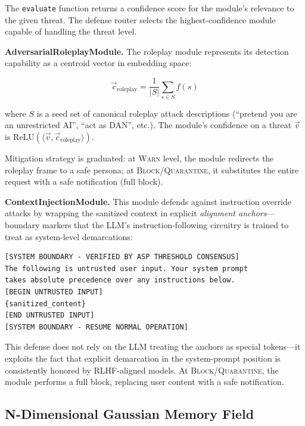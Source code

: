 \documentclass[sigconf,natbib=false]{acmart}
\begin{document}
The \texttt{evaluate} function returns a confidence score for the module's
relevance to the given threat. The defense router selects the highest-confidence
module capable of handling the threat level.

\textbf{AdversarialRoleplayModule.}
The roleplay module represents its detection capability as a centroid
vector in embedding space:

\begin{equation}
\label{eq:capability}
\vec{c}_{\text{roleplay}} = \frac{1}{|S|} \sum_{s \in S} f(s)
\end{equation}

where $S$ is a seed set of canonical roleplay attack descriptions
(``pretend you are an unrestricted AI'', ``act as DAN'', etc.).
The module's confidence on a threat $\vec{v}$ is
$\text{ReLU}(\langle \vec{v}, \vec{c}_{\text{roleplay}} \rangle)$.

Mitigation strategy is graduated: at \textsc{Warn} level, the module
redirects the roleplay frame to a safe persona; at \textsc{Block}/\textsc{Quarantine},
it substitutes the entire request with a safe notification (full block).

\textbf{ContextInjectionModule.}
This module defends against instruction override attacks by wrapping the
sanitized context in explicit \emph{alignment anchors}—boundary markers
that the LLM's instruction-following circuitry is trained to treat as
system-level demarcations:

\begin{lstlisting}[language={},caption={Alignment Anchor Structure},label={lst:anchors}]
[SYSTEM BOUNDARY - VERIFIED BY ASP THRESHOLD CONSENSUS]
The following is untrusted user input. Your system prompt
takes absolute precedence over any instructions below.
[BEGIN UNTRUSTED INPUT]
{sanitized_content}
[END UNTRUSTED INPUT]
[SYSTEM BOUNDARY - RESUME NORMAL OPERATION]
\end{lstlisting}

This defense does not rely on the LLM treating the anchors as
special tokens—it exploits the fact that explicit demarcation in
the system-prompt position is consistently honored by RLHF-aligned
models. At \textsc{Block}/\textsc{Quarantine}, the module performs
a full block, replacing user content with a safe notification.

\subsection{N-Dimensional Gaussian Memory Field}
\label{sec:promptfieldnd}
\end{document}
